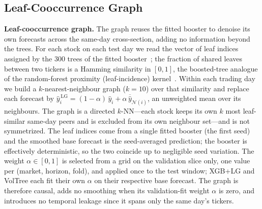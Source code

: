 \documentclass[runningheads,a4paper]{llncs}
\begin{document}
\subsection{Leaf-Cooccurrence Graph}
\textbf{Leaf-cooccurrence graph.} The graph reuses the fitted booster to denoise its own forecasts across
the same-day cross-section, adding no information beyond the trees. For each stock on each test day we read
the vector of leaf indices assigned by the 300 trees of the fitted booster~\cite{chen2016}; the fraction
of shared leaves between two tickers is a Hamming similarity in $[0,1]$, the boosted-tree analogue of the
random-forest proximity (leaf-incidence) kernel~\cite{rhodes2023}. Within each trading day we build a $k$-nearest-neighbour graph
($k=10$) over that similarity and replace each forecast by
$\hat y_i^{\,\mathrm{LG}}=(1-\alpha)\,\hat y_i+\alpha\,\overline{\hat y}_{\mathcal{N}(i)}$, an unweighted
mean over its neighbours. The graph is a directed $k$-NN---each stock keeps its own $k$ most leaf-similar
same-day peers and is excluded from its own neighbour set---and is not symmetrized. The leaf indices come
from a single fitted booster (the first seed) and the smoothed base forecast is the seed-averaged
prediction; the booster is effectively deterministic, so the two coincide up to negligible seed variation. The weight $\alpha\in[0,1]$ is selected from a grid on the validation slice only,
one value per (market, horizon, fold), and applied once to the test window; XGB+LG and VolTree each fit
their own $\alpha$ on their respective base forecast. The graph is therefore causal, adds no smoothing
when its validation-fit weight $\alpha$ is zero, and introduces no temporal leakage since it spans only the same
day's tickers.
\end{document}
